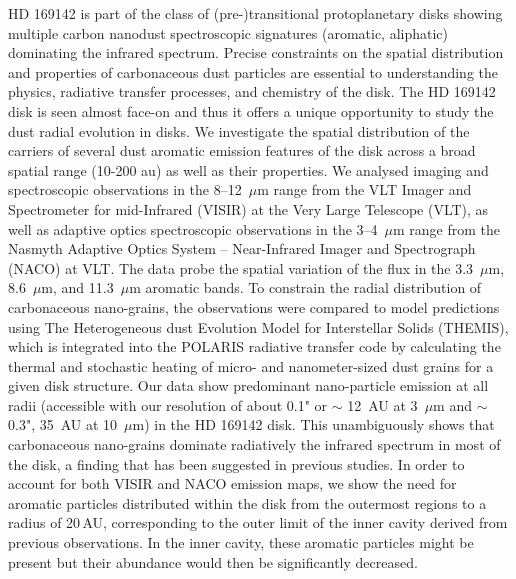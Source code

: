 \documentclass{aa}
\newcommand{\mic}{~$\mu$m\xspace}
\begin{document}
\abstract
        {HD 169142 is part of the class of (pre-)transitional protoplanetary disks showing multiple carbon nanodust spectroscopic signatures (aromatic, aliphatic) dominating the infrared spectrum. Precise constraints on the spatial distribution and properties of carbonaceous dust particles are essential to understanding the physics, radiative transfer processes, and chemistry of the disk. The HD 169142 disk is seen almost face-on and thus it offers a unique opportunity to study the dust radial evolution in disks.}
   {We investigate the spatial distribution of the carriers of several dust aromatic emission features of the disk across a broad spatial range  (10-200 au) as well as their properties. }
   {We analysed imaging and spectroscopic observations in the 8–12\mic range from the VLT Imager and Spectrometer for mid-Infrared (VISIR) at the Very Large Telescope (VLT), as well as adaptive optics spectroscopic observations in the 3–4\mic range from the Nasmyth Adaptive Optics System -- Near-Infrared Imager and Spectrograph (NACO) at VLT.
   The data probe the spatial variation of the flux in the 3.3\mic, 8.6\mic, and 11.3\mic aromatic bands. To constrain the radial distribution of carbonaceous nano-grains, the observations were compared to model predictions using The Heterogeneous dust Evolution Model for Interstellar Solids (THEMIS), which is integrated into the POLARIS radiative transfer code by calculating the thermal and stochastic heating of micro- and nanometer-sized dust grains for a given disk structure.} %
   {Our data show predominant nano-particle emission at all radii (accessible with our resolution of about 0.1" or $\sim$ 12~AU at 3\mic and $\sim$ 0.3", 35~AU at 10\mic) in the HD 169142 disk. This unambiguously shows that carbonaceous nano-grains dominate radiatively the infrared spectrum in most of the disk, a finding that has been suggested in previous studies.
   In order to account for both VISIR and NACO emission maps, we show the need for aromatic particles distributed within the disk from the outermost regions to a radius of 20\,AU, corresponding to the outer limit of the inner cavity derived from previous observations. In the inner cavity, these aromatic particles might be present but their abundance would then be significantly decreased.}
   {}
\end{document}
